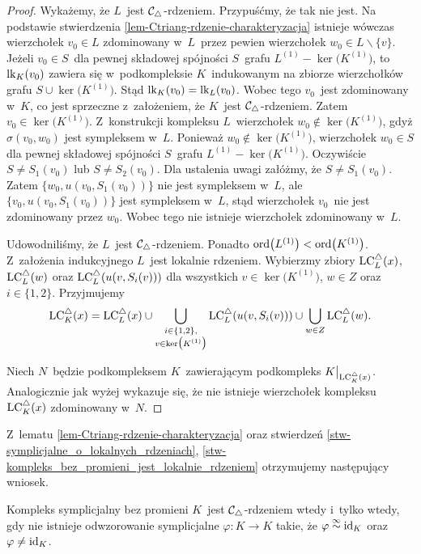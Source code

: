 \begin{proof}
Wykażemy, że $L$~jest $\mathcal{C}_\triangle$-rdzeniem. Przypuśćmy, że tak nie jest. Na podstawie stwierdzenia \ref{lem-Ctriang-rdzenie-charakteryzacja} istnieje wówczas wierzchołek $v_0\in L$ zdominowany w~$L$~przez pewien wierzchołek $w_0\in L\smallsetminus\{v\}$. Jeżeli $v_0\in S$~dla pewnej składowej spójności $S$~grafu $L^{(1)}-\ker\bigl(K^{(1)}\bigr)$, to $\operatorname{lk}_K(v_0)$ zawiera się w~podkompleksie $K$~indukowanym na zbiorze wierzchołków grafu $S\cup \ker\bigl(K^{(1)}\bigr)$. Stąd $\operatorname{lk}_K(v_0)=\operatorname{lk}_L(v_0)$. Wobec tego $v_0$~jest zdominowany w~$K$, co jest sprzeczne z~założeniem, że $K$~jest \mbox{$\mathcal{C}_\triangle$-rdzeniem}. Zatem $v_0\in \ker\bigl(K^{(1)}\bigr)$. Z~konstrukcji kompleksu $L$~wierzchołek $w_0\not\in \ker\bigl(K^{(1)}\bigr)$, gdyż $\sigma(v_0,w_0)$ jest sympleksem w~$L$. Ponieważ $w_0\not\in \ker\bigl(K^{(1)}\bigr)$,  wierzchołek $w_0\in S$ dla pewnej składowej spójności $S$~grafu $L^{(1)}-\ker\bigl(K^{(1)}\bigr)$. Oczywiście $S\not=S_1(v_0)$ lub $S\not=S_2(v_0)$. Dla ustalenia uwagi załóżmy, że $S\not=S_1(v_0)$. Zatem $\{w_0,u(v_0,S_1(v_0))\}$ nie jest sympleksem w~$L$, ale $\{v_0,u(v_0,S_1(v_0))\}$ jest sympleksem w~$L$, stąd wierzchołek $v_0$~nie jest zdominowany przez $w_0$. Wobec tego nie istnieje wierzchołek zdominowany w~$L$.

Udowodniliśmy, że $L$~jest $\mathcal{C}_\triangle$-rdzeniem. Ponadto $\operatorname{ord}\bigl(L^{(1)}\bigr)<\operatorname{ord}\bigl(K^{(1)}\bigr)$. Z~założenia indukcyjnego $L$~jest lokalnie rdzeniem. Wybierzmy zbiory $\operatorname{LC}^\triangle_L(x)$, $\operatorname{LC}^\triangle_L(w)$ oraz $\operatorname{LC}^\triangle_L(u(v,S_i(v)))$ dla wszystkich $v\in \ker\bigl(K^{(1)}\bigr)$, $w\in Z$ oraz $i\in\{1,2\}$. Przyjmujemy \[\operatorname{LC}^\triangle_K(x)=\operatorname{LC}^\triangle_L(x)\cup\bigcup_{\substack{i\in\{1,2\},\\v\in \operatorname{ker}\bigl(K^{(1)}\bigr)}}\operatorname{LC}^\triangle_L(u(v,S_i(v))) \cup \bigcup_{w\in Z}\operatorname{LC}^\triangle_L(w).\]

Niech $N$~będzie podkompleksem $K$~zawierającym podkompleks $K\big|_{\operatorname{LC}^\triangle_K(x)}$. Analogicznie jak wyżej wykazuje się, że nie istnieje wierzchołek kompleksu $\operatorname{LC}^\triangle_K(x)$ zdominowany w~$N$.
\end{proof}

Z~lematu \ref{lem-Ctriang-rdzenie-charakteryzacja} oraz stwierdzeń \ref{stw-symplicjalne_o_lokalnych_rdzeniach}, \ref{stw-kompleks_bez_promieni_jest_lokalnie_rdzeniem} otrzymujemy następujący wniosek.

\begin{wn}\label{wn-bez_promieni_rdzen_nie_istnieje_niesk_sasiednie_id}
Kompleks symplicjalny bez promieni $K$~jest $\mathcal{C}_\triangle$-rdzeniem wtedy i~tylko wtedy, gdy nie istnieje odwzorowanie symplicjalne $\varphi\colon K\to K$ takie, że $\varphi\stackrel{\infty}{\sim}\operatorname{id}_K$ oraz $\varphi\not=\operatorname{id}_K$.
\end{wn}

